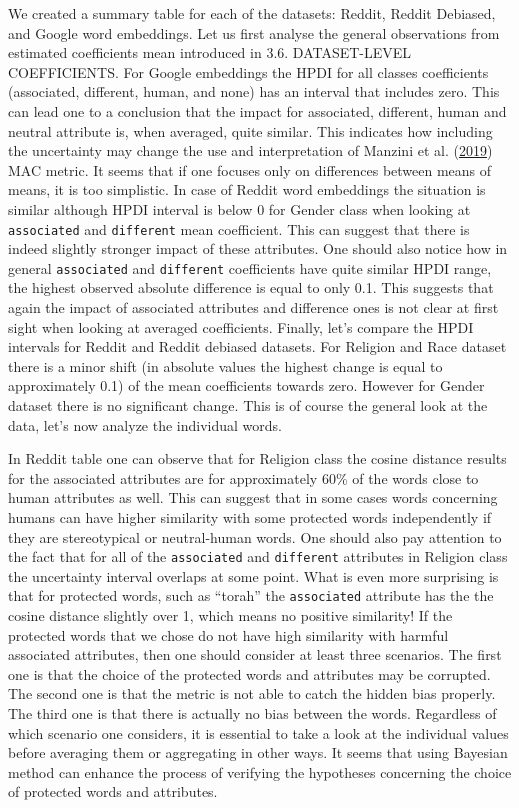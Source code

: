 \documentclass[12pt,]{book}
\begin{document}
We created a summary table for each of the datasets: Reddit, Reddit
Debiased, and Google word embeddings. Let us first analyse the general
observations from estimated coefficients mean introduced in 3.6.
DATASET-LEVEL COEFFICIENTS. For Google embeddings the HPDI for all
classes coefficients (associated, different, human, and none) has an
interval that includes zero. This can lead one to a conclusion that the
impact for associated, different, human and neutral attribute is, when
averaged, quite similar. This indicates how including the uncertainty
may change the use and interpretation of Manzini et al.
(\protect\hyperlink{ref-Manzini2019blackToCriminal}{2019}) MAC metric.
It seems that if one focuses only on differences between means of means,
it is too simplistic. In case of Reddit word embeddings the situation is
similar although HPDI interval is below 0 for Gender class when looking
at \texttt{associated} and \texttt{different} mean coefficient. This can
suggest that there is indeed slightly stronger impact of these
attributes. One should also notice how in general \texttt{associated}
and \texttt{different} coefficients have quite similar HPDI range, the
highest observed absolute difference is equal to only 0.1. This suggests
that again the impact of associated attributes and difference ones is
not clear at first sight when looking at averaged coefficients. Finally,
let's compare the HPDI intervals for Reddit and Reddit debiased
datasets. For Religion and Race dataset there is a minor shift (in
absolute values the highest change is equal to approximately 0.1) of the
mean coefficients towards zero. However for Gender dataset there is no
significant change. This is of course the general look at the data,
let's now analyze the individual words.

In Reddit table one can observe that for Religion class the cosine
distance results for the associated attributes are for approximately
60\% of the words close to human attributes as well. This can suggest
that in some cases words concerning humans can have higher similarity
with some protected words independently if they are stereotypical or
neutral-human words. One should also pay attention to the fact that for
all of the \texttt{associated} and \texttt{different} attributes in
Religion class the uncertainty interval overlaps at some point. What is
even more surprising is that for protected words, such as ``torah'' the
\texttt{associated} attribute has the the cosine distance slightly over
1, which means no positive similarity! If the protected words that we
chose do not have high similarity with harmful associated attributes,
then one should consider at least three scenarios. The first one is that
the choice of the protected words and attributes may be corrupted. The
second one is that the metric is not able to catch the hidden bias
properly. The third one is that there is actually no bias between the
words. Regardless of which scenario one considers, it is essential to
take a look at the individual values before averaging them or
aggregating in other ways. It seems that using Bayesian method can
enhance the process of verifying the hypotheses concerning the choice of
protected words and attributes.
\end{document}
